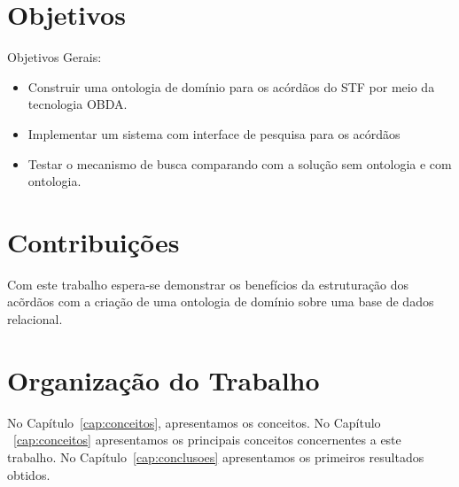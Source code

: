 \section{Objetivos}
\label{sec:objetivo}

Objetivos Gerais:

\begin{itemize}
    \item Construir uma ontologia de domínio para os acórdãos do STF por meio da 
    tecnologia OBDA.
    
    \item Implementar um sistema com interface de pesquisa para os acórdãos

    \item Testar o mecanismo de busca comparando com a solução sem ontologia e 
    com ontologia.
\end{itemize}

\section{Contribuições}
\label{sec:contribucoes}

Com este trabalho espera-se demonstrar os benefícios da estruturação dos acõrdãos
com a criação de uma ontologia de domínio sobre uma base de dados relacional.


\section{Organização do Trabalho}
\label{sec:organizacao_trabalho}

No Capítulo~\ref{cap:conceitos}, apresentamos os conceitos. No Capítulo
~\ref{cap:conceitos} apresentamos os principais conceitos concernentes a este 
trabalho. No Capítulo~\ref{cap:conclusoes} apresentamos os primeiros resultados
obtidos.


